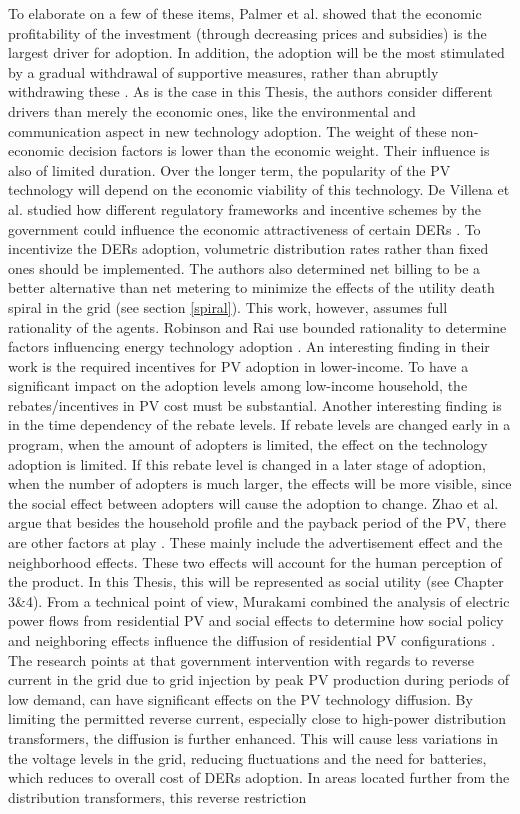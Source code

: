 To elaborate on a few of these items, Palmer et al. showed that the economic profitability of the investment (through decreasing prices and subsidies) is the largest driver for adoption. In addition, the adoption will be the most stimulated by a gradual withdrawal of supportive measures, rather than abruptly withdrawing these \cite{ItalyAdoption}. As is the case in this Thesis, the authors consider different drivers than merely the economic ones, like the environmental and communication aspect in new technology adoption. The weight of these non-economic decision factors is lower than the economic weight. Their influence is also of limited duration. Over the longer term, the popularity of the PV technology will depend on the economic viability of this technology. De Villena et al. studied how different regulatory frameworks and incentive schemes by the government could influence the economic attractiveness of certain DERs \cite{Regulation}. To incentivize the DERs adoption, volumetric distribution rates rather than fixed ones should be implemented. The authors also determined net billing to be a better alternative than net metering to minimize the effects of the utility death spiral in the grid (see section \ref{spiral}). This work, however, assumes full rationality of the agents. Robinson and Rai use bounded rationality to determine factors influencing energy technology adoption \cite{spatiotemp,spatiotemp2}. An interesting finding in their work is the required incentives for PV adoption in lower-income. To have a significant impact on the adoption levels among low-income household, the rebates/incentives in PV cost must be substantial. Another interesting finding is in the time dependency of the rebate levels. If rebate levels are changed early in a program, when the amount of adopters is limited, the effect on the technology adoption is limited. If this rebate level is changed in a later stage of adoption, when the number of adopters is much larger, the effects will be more visible, since the social effect between adopters will cause the adoption to change. Zhao et al. argue that besides the household profile and the payback period of the PV, there are other factors at play \cite{ABMPV}. These mainly include the advertisement effect and the neighborhood effects. These two effects will account for the human perception of the product. In this Thesis, this will be represented as social utility (see Chapter 3\&4). From a technical point of view, Murakami combined the analysis of electric power flows from residential PV and social effects to determine how social policy and neighboring effects influence the diffusion of residential PV configurations \cite{flowanalysis}. The research points at that government intervention with regards to reverse current in the grid due to grid injection by peak PV production during periods of low demand, can have significant effects on the PV technology diffusion. By limiting the permitted reverse current, especially close to high-power distribution transformers, the diffusion is further enhanced. This will cause less variations in the voltage levels in the grid, reducing fluctuations and the need for batteries, which reduces to overall cost of DERs adoption. In areas located further from the distribution transformers, this reverse restriction 